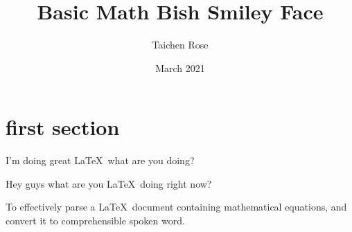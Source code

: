 \documentclass{article}
\title{Basic Math Bish Smiley Face}
\author{Taichen Rose}
\date{March 2021}
\begin{document}
\section{first section}

I'm doing great \LaTeX\ what are you doing?

Hey guys what are you \LaTeX\ doing right now?

To effectively parse a \LaTeX\ document containing mathematical equations, and convert it to comprehensible spoken word.
\end{document}
